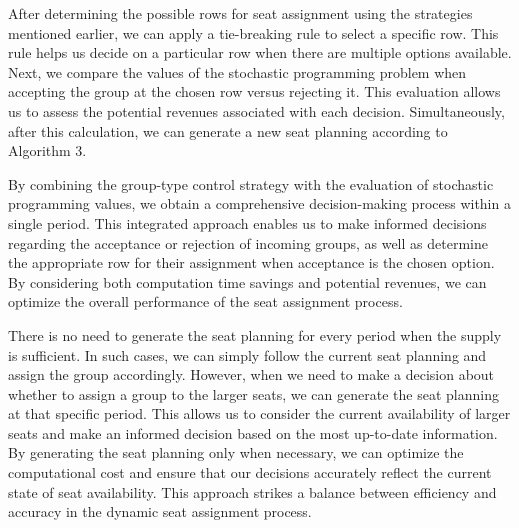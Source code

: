 After determining the possible rows for seat assignment using the strategies mentioned earlier, we can apply a tie-breaking rule to select a specific row. This rule helps us decide on a particular row when there are multiple options available. Next, we compare the values of the stochastic programming problem when accepting the group at the chosen row versus rejecting it. This evaluation allows us to assess the potential revenues associated with each decision. Simultaneously, after this calculation, we can generate a new seat planning according to Algorithm 3.


By combining the group-type control strategy with the evaluation of stochastic programming values, we obtain a comprehensive decision-making process within a single period. This integrated approach enables us to make informed decisions regarding the acceptance or rejection of incoming groups, as well as determine the appropriate row for their assignment when acceptance is the chosen option. By considering both computation time savings and potential revenues, we can optimize the overall performance of the seat assignment process.

There is no need to generate the seat planning for every period when the supply is sufficient. In such cases, we can simply follow the current seat planning and assign the group accordingly. However, when we need to make a decision about whether to assign a group to the larger seats, we can generate the seat planning at that specific period. This allows us to consider the current availability of larger seats and make an informed decision based on the most up-to-date information.
By generating the seat planning only when necessary, we can optimize the computational cost and ensure that our decisions accurately reflect the current state of seat availability. This approach strikes a balance between efficiency and accuracy in the dynamic seat assignment process.






